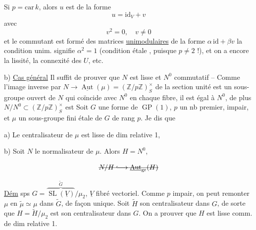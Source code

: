 Si $p=\mathrm{car}\,k$, alors $u$ est de la forme
\[
 u=\mathrm{id}_V+v
\]
avec 
\[
 v^2=0,\quad v\ne0
\]
et le commutant est formé des matrices \uline{unimodulaires} de la forme \deleted{\unsure{$\lambda$}} $\alpha\,\mathrm{id}+\beta v$   la condition unim. signifie $\alpha^2=1$ (condition étale , puisque $p\ne2$ !), et on a encore la lissité, la connexité des $U$, etc. 

b) \uline{Cas général} Il suffit de prouver que $N$ est lisse et $N^0$ commutatif -- Comme  l'image inverse par $N\longrightarrow\underline{\operatorname{Aut}}(\mu)=(\mathbb Z/p\mathbb Z)^\times_S$ de la section unité est un sous-groupe ouvert de $N$ qui coïncide avec $N^0$ en chaque fibre, il est égal à $N^0$, de plus $N/N^0\subset(\mathbb Z/p\mathbb Z)^\times_S$ est
Soit $G$ une forme de $\operatorname{GP}(1)$,  $p$ un nb premier, impair, et $\mu$ un sous-groupe fini étale de $G$ de rang $p$. Je dis que

a) Le centralisateur  de $\mu$ est lisse  de dim relative 1, 

b) Soit  $N$ le normalisateur de $\mu$. Alors $H=N^0$,  

\[
 \deleted{N/H\lhook\joinrel\longrightarrow\underline{\operatorname{Aut}}_{\mathrm{gr}}(H)}
\]

\uline{Dém} sps $G=\overbrace{\operatorname{SL}(\underline V)}^{\widetilde G}/\mu_2$, $\underline V$ fibré vectoriel. Comme $p$ impair, on peut remonter $\mu$ en $\widetilde\mu\simeq\mu$ dans $\widetilde G$, de façon unique. Soit $\widetilde H$ son centralisateur dans $G$, de sorte que $H=\widetilde H/\mu_2$ est son centralisateur dans $G$. On a  prouver que $H$ est lisse comm. de dim relative 1.

